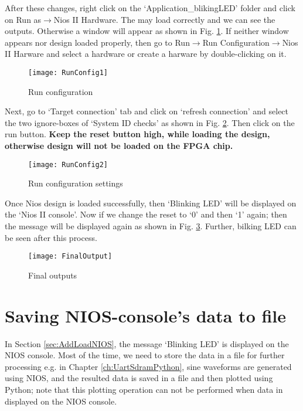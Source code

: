 After these changes, right click on the `Application\_blikingLED' folder and click on Run as$\rightarrow$Nios II Hardware. The may load correctly and we can see the outputs. Otherwise a window will appear as shown in Fig. \ref{fig:1run}. If neither window appears nor design loaded properly, then go to Run$\rightarrow$Run Configuration$\rightarrow$Nios II Harware and select a hardware or create a harware by double-clicking on it. 

\begin{figure}
	\centering
	\texttt{[image: RunConfig1]}
	\caption{Run configuration}
	\label{fig:1run}
\end{figure}


Next, go to `Target connection' tab and click on `refresh connection' and select the two ignore-boxes of `System ID checks' as shown in Fig. \ref{fig:2run}. Then click on the run button. \textbf{Keep the reset button high, while loading the design, otherwise design will not be loaded on the FPGA chip.}

\begin{figure}
	\centering
	\texttt{[image: RunConfig2]}
	\caption{Run configuration settings}
	\label{fig:2run}
\end{figure}

Once Nios design is loaded successfully, then `Blinking LED' will be displayed on the `Nios II console'. Now if we change the reset to `0' and then `1' again; then the message will be displayed again as shown in Fig. \ref{fig:FinalOutput}. Further, bilking LED can be seen after this process. 

\begin{figure}
	\centering
	\texttt{[image: FinalOutput]}
	\caption{Final outputs}
	\label{fig:FinalOutput}
\end{figure}

\section{Saving NIOS-console's data to file}
In Section \ref{sec:AddLoadNIOS}, the message `Blinking LED' is displayed on the NIOS console. Most of the time, we need to store the data in a file for further processing e.g. in Chapter \ref{ch:UartSdramPython}, sine waveforms are generated using NIOS, and the resulted data is saved in a file and then plotted using Python; note that this plotting operation can not be performed when data in displayed on the NIOS console. 

